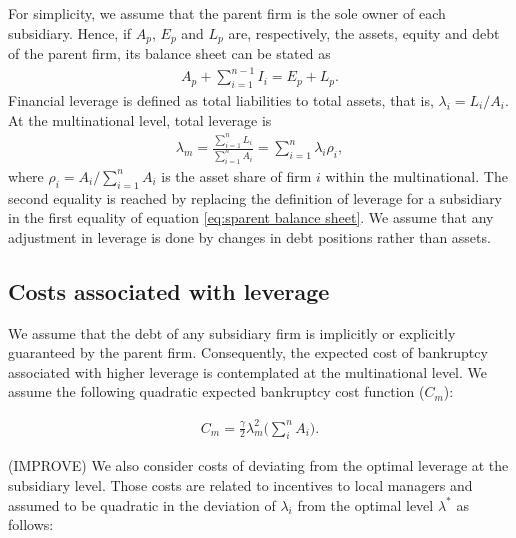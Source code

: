 \documentclass[12pt]{article}
\begin{document}
	 For simplicity, we assume that the parent firm is the sole owner of each subsidiary. Hence, if $A_p$, $E_p$ and $L_p$ are, respectively, the assets, equity and debt of the parent firm, its balance sheet can be stated as  
		\begin{equation}
	\begin{aligned}
	A_p+\sum_{i=1}^{n-1}I_i=E_p+L_p. 
	\end{aligned}
	\label{eq:sparent balance sheet}
	\end{equation}
	Financial leverage is defined as total liabilities to total assets, that is, $\lambda_i=L_i/A_i$. At the multinational level, total leverage is
		\begin{equation}
	\begin{aligned}
	\lambda_m=\frac{\sum_{i=1}^{n}L_i}{\sum_{i=1}^{n}A_i}=\sum_{i=1}^{n}\lambda_i\rho_i, 
	\end{aligned}
	\label{eq:sparent balance sheet}
	\end{equation} 
	 where $\rho_i=A_i/\sum_{i=1}^{n}A_i$ is the asset share of firm $i$ within the multinational. The second equality is reached by replacing the definition of leverage for a subsidiary in the first equality of equation \ref{eq:sparent balance sheet}. We assume that any adjustment in leverage is done by changes in debt positions rather than assets. 
	\subsection{Costs associated with leverage}
		 \label{subsec:costs}
	We assume that the debt of any subsidiary firm is implicitly or explicitly guaranteed by the parent firm. Consequently, the expected cost of bankruptcy associated with higher leverage is contemplated at the multinational level. We assume the following quadratic expected bankruptcy cost function ($C_m$):
	 
	\begin{equation}
	\begin{aligned}
	C_m=\frac{\gamma}{2}\lambda_m^2\bigg(\sum_{i}^{n}A_i\bigg).
	\end{aligned}
	\label{eq:cost bankruptcy}
	\end{equation}
	
	(IMPROVE) We also consider costs of deviating from the optimal leverage at the subsidiary level. Those costs are related to incentives to local managers and assumed to be quadratic in the deviation of $\lambda_i$ from the optimal level $\lambda^*$ as follows:  
	
\end{document}
